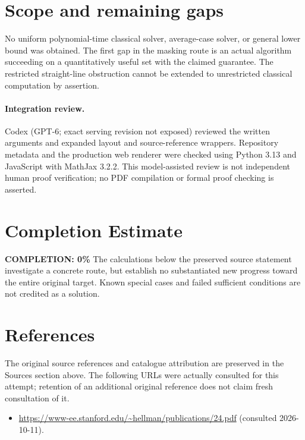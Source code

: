 \documentclass[11pt]{article}
\begin{document}
\section{Scope and remaining gaps}
No uniform polynomial-time classical solver, average-case solver, or general
lower bound was obtained. The first gap in the masking route is an actual
algorithm succeeding on a quantitatively useful set with the claimed guarantee.
The restricted straight-line obstruction cannot be extended to unrestricted
classical computation by assertion.
\paragraph{Integration review.} Codex (GPT-6; exact serving revision not exposed) reviewed the written arguments and expanded layout and source-reference wrappers. Repository metadata and the production web renderer were checked using Python 3.13 and JavaScript with MathJax 3.2.2. This model-assisted review is not independent human proof verification; no PDF compilation or formal proof checking is asserted.

\section{Completion Estimate}
\noindent\textbf{COMPLETION: 0\%}
The calculations below the preserved source statement investigate a concrete route,
but establish no substantiated new progress toward the entire original target.
Known special cases and failed sufficient conditions are not credited as a solution.
\section{References}
The original source references and catalogue attribution are preserved in the
Sources section above. The following URLs were actually consulted for this attempt;
retention of an additional original reference does not claim fresh consultation of it.
\begin{itemize}
\item \url{https://www-ee.stanford.edu/~hellman/publications/24.pdf} (consulted 2026-10-11). 
\end{itemize}
\end{document}
